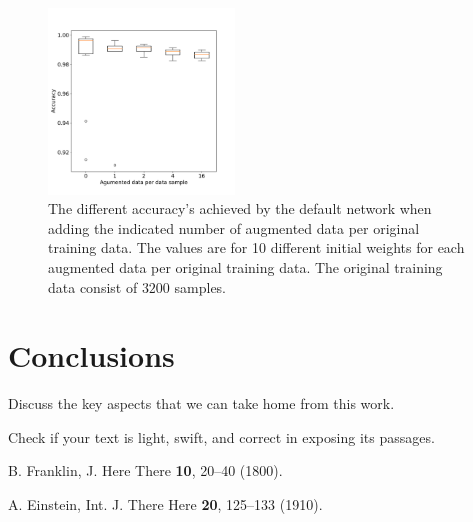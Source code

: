 \documentclass[prl,twocolumn]{revtex4-1}
\begin{document}
\begin{figure}[!tb]
  \includegraphics[width=0.44\textwidth]{ag_train_box.pdf}
  \caption{The different accuracy's achieved by the default network when adding the indicated number of augmented data per original training data. The values are for 10 different initial weights for each augmented data per original training data. The original training data consist of $3200$ samples.}
  \label{fig:augmented_train_sampels}
\end{figure}


\section{Conclusions}

Discuss the key aspects that we can take home from this work.

Check if your text is light, swift, and correct in exposing its passages.





\begin{thebibliography}{99}

  B. Franklin,
  J. Here There {\bf 10}, 20--40 (1800).
  
  A. Einstein,
  Int. J. There Here {\bf 20}, 125--133 (1910).
  
\end{thebibliography}

\clearpage

\end{document}
